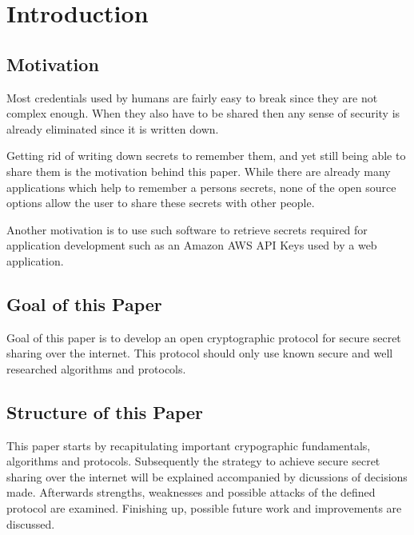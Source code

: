 \chapter{Introduction}
\label{cha:Introduction}



\section{Motivation}
\label{sec:Motivation}

Most credentials used by humans are fairly easy to break since they are not
complex enough. When they also have to be shared then any sense of security is
already eliminated since it is written down.

Getting rid of writing down secrets to remember them, and yet still being able
to share them is the motivation behind this paper. While there are already many
applications which help to remember a persons secrets, none of the open source
options allow the user to share these secrets with other people.

Another motivation is to use such software to retrieve secrets required for
application development such as an Amazon AWS API Keys used by a web
application.

\section{Goal of this Paper}
\label{sec:GoalOfThisPaper}

Goal of this paper is to develop an open cryptographic protocol for secure
secret sharing over the internet. This protocol should only use known secure
and well researched algorithms and protocols.

\section{Structure of this Paper}
\label{sec:StructureOfThisPaper}

This paper starts by recapitulating important crypographic fundamentals,
algorithms and protocols. Subsequently the strategy to achieve secure secret
sharing over the internet will be explained accompanied by dicussions of
decisions made. Afterwards strengths, weaknesses and possible attacks of the
defined protocol are examined. Finishing up, possible future work and
improvements are discussed.
